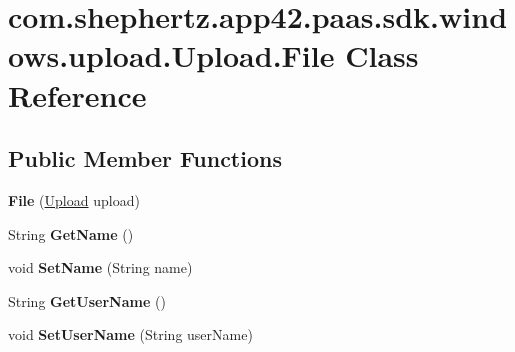 \hypertarget{classcom_1_1shephertz_1_1app42_1_1paas_1_1sdk_1_1windows_1_1upload_1_1_upload_1_1_file}{\section{com.\+shephertz.\+app42.\+paas.\+sdk.\+windows.\+upload.\+Upload.\+File Class Reference}
\label{classcom_1_1shephertz_1_1app42_1_1paas_1_1sdk_1_1windows_1_1upload_1_1_upload_1_1_file}
}
\subsection*{Public Member Functions}
\begin{DoxyCompactItemize}
\item 
\hypertarget{classcom_1_1shephertz_1_1app42_1_1paas_1_1sdk_1_1windows_1_1upload_1_1_upload_1_1_file_a7d7b81a952be96668f1002a7bc746dbb}{{\bfseries File} (\hyperlink{classcom_1_1shephertz_1_1app42_1_1paas_1_1sdk_1_1windows_1_1upload_1_1_upload}{Upload} upload)}\label{classcom_1_1shephertz_1_1app42_1_1paas_1_1sdk_1_1windows_1_1upload_1_1_upload_1_1_file_a7d7b81a952be96668f1002a7bc746dbb}

\item 
\hypertarget{classcom_1_1shephertz_1_1app42_1_1paas_1_1sdk_1_1windows_1_1upload_1_1_upload_1_1_file_aa83673d50048e41cdc5e73e3e9ac5376}{String {\bfseries Get\+Name} ()}\label{classcom_1_1shephertz_1_1app42_1_1paas_1_1sdk_1_1windows_1_1upload_1_1_upload_1_1_file_aa83673d50048e41cdc5e73e3e9ac5376}

\item 
\hypertarget{classcom_1_1shephertz_1_1app42_1_1paas_1_1sdk_1_1windows_1_1upload_1_1_upload_1_1_file_a6b237f6572422731b8e67c80c55cec8b}{void {\bfseries Set\+Name} (String name)}\label{classcom_1_1shephertz_1_1app42_1_1paas_1_1sdk_1_1windows_1_1upload_1_1_upload_1_1_file_a6b237f6572422731b8e67c80c55cec8b}

\item 
\hypertarget{classcom_1_1shephertz_1_1app42_1_1paas_1_1sdk_1_1windows_1_1upload_1_1_upload_1_1_file_a3228c8f6663dc1aff3244bd0eb1543a1}{String {\bfseries Get\+User\+Name} ()}\label{classcom_1_1shephertz_1_1app42_1_1paas_1_1sdk_1_1windows_1_1upload_1_1_upload_1_1_file_a3228c8f6663dc1aff3244bd0eb1543a1}

\item 
\hypertarget{classcom_1_1shephertz_1_1app42_1_1paas_1_1sdk_1_1windows_1_1upload_1_1_upload_1_1_file_a45154eefdc9a9b80722d7a7f807f7bf8}{void {\bfseries Set\+User\+Name} (String user\+Name)}\label{classcom_1_1shephertz_1_1app42_1_1paas_1_1sdk_1_1windows_1_1upload_1_1_upload_1_1_file_a45154eefdc9a9b80722d7a7f807f7bf8}


\end{DoxyCompactItemize}
